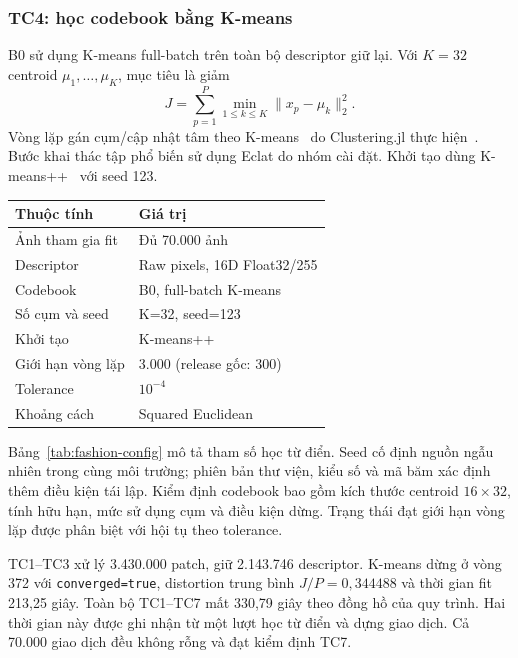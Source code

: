 \subsubsection{TC4: học codebook bằng K-means}
B0 sử dụng K-means full-batch trên toàn bộ descriptor giữ lại.
Với $K=32$ centroid
$\mu_1,\ldots,\mu_K$, mục tiêu là giảm
\begin{equation}
J=\sum_{p=1}^{P}\min_{1\leq k\leq K}\|x_p-\mu_k\|_2^2.
\label{eq:kmeans}
\end{equation}
Vòng lặp gán cụm/cập nhật tâm theo K-means~\cite{lloyd} do
Clustering.jl thực hiện~\cite{clustering}. Bước khai thác tập phổ biến
sử dụng Eclat do nhóm cài đặt. Khởi tạo dùng K-means++~\cite{kmpp} với seed 123.

\begin{reporttable}
\caption{Cấu hình học codebook trên Colab; giới hạn vòng lặp được tăng so với cấu hình tham chiếu.}
\label{tab:fashion-config}
\small
\begin{tabular}{lp{}}\toprule
Thuộc tính & Giá trị\\\midrule
Ảnh tham gia fit & Đủ 70.000 ảnh\\
Descriptor & Raw pixels, 16D Float32/255\\
Codebook & B0, full-batch K-means\\
Số cụm và seed & K=32, seed=123\\
Khởi tạo & K-means++\\
Giới hạn vòng lặp & 3.000 (release gốc: 300)\\
Tolerance & $10^{-4}$\\
Khoảng cách & Squared Euclidean\\\bottomrule
\end{tabular}
\end{reporttable}

Bảng~\ref{tab:fashion-config} mô tả tham số học từ điển. Seed cố định
nguồn ngẫu nhiên trong cùng môi trường; phiên bản thư viện, kiểu số và
mã băm xác định thêm điều kiện tái lập. Kiểm định codebook bao gồm kích
thước centroid $16\times32$, tính hữu hạn, mức sử dụng cụm và điều kiện
dừng. Trạng thái đạt giới hạn vòng lặp được phân biệt với hội tụ theo
tolerance.

TC1--TC3 xử lý 3.430.000 patch, giữ 2.143.746 descriptor. K-means dừng
ở vòng 372 với \texttt{converged=true}, distortion trung bình
$J/P=0{,}344488$ và thời gian fit 213,25 giây. Toàn bộ TC1--TC7 mất
330,79 giây theo đồng hồ của quy trình. Hai thời gian này được ghi nhận
từ một lượt học từ điển và dựng giao dịch. Cả 70.000 giao dịch đều không
rỗng và đạt kiểm định TC7.

